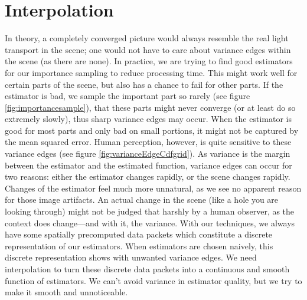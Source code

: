\section{Interpolation}
\label{ch:interpolation}

In theory, a completely converged picture would always resemble the real light transport in the scene; one would not have to care about variance edges within the scene (as there are none). In practice, we are trying to find good estimators for our importance sampling to reduce processing time. This might work well for certain parts of the scene, but also has a chance to fail for other parts. If the estimator is bad, we sample the important part so rarely (see figure \ref{fig:importancesample}), that these parts might never converge (or at least do so extremely slowly), thus sharp variance edges may occur. When the estimator is good for most parts and only bad on small portions, it might not be captured by the mean squared error. Human perception, however, is quite sensitive to these variance edges (see figure \ref{fig:varianceEdgeCdfgrid}). As variance is the margin between the estimator and the estimated function, variance edges can occur for two reasons: either the estimator changes rapidly, or the scene changes rapidly. Changes of the estimator feel much more unnatural, as we see no apparent reason for those image artifacts. An actual change in the scene (like a hole you are looking through) might not be judged that harshly by a human observer, as the context does change---and with it, the variance. With our techniques, we always have some spatially precomputed data packets which constitute a discrete representation of our estimators. When estimators are chosen naively, this discrete representation shows with unwanted variance edges. We need interpolation to turn these discrete data packets into a continuous and smooth function of estimators. We can't avoid variance in estimator quality, but we try to make it smooth and unnoticeable.

%    

